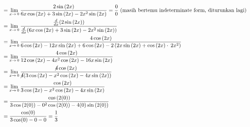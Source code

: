 \documentclass[12pt]{article}
\begin{document}
\begin{fleqn}[2em]
\begin{align*}
{\begin{aligned}
  & = \lim _{x\to \:0} \frac{2\sin \left(2x\right)}{6x\cos \left(2x\right)+3\sin \left(2x\right)-2x^2\sin \left(2x\right)} = \frac{0}{0} \text{ (masih bertemu indeterminate form, diturunkan lagi)} \\
  & = \lim _{x\to \:0} \frac{\frac{d}{dx}(2\sin \left(2x\right))}{\frac{d}{dx}(6x\cos \left(2x\right)+3\sin \left(2x\right)-2x^2\sin \left(2x\right))} \\
  & = \lim _{x\to \:0} \frac{4\cos \left(2x\right)}{6\cos \left(2x\right)-12x\sin \left(2x\right)+6\cos \left(2x\right)-2\left(2x\sin \left(2x\right)+\cos \left(2x\right)\cdot \:2x^2\right)} \\
  & = \lim _{x\to \:0}\frac{4\cos \left(2x\right)}{12\cos \left(2x\right)-4x^2\cos \left(2x\right)-16x\sin \left(2x\right)} \\
  & = \lim _{x\to \:0}\frac{\cancel{4}\cos \left(2x\right)}{\cancel{4}(3\cos \left(2x\right)-x^2\cos \left(2x\right)-4x\sin \left(2x\right))} \\
  & = \lim _{x\to \:0}\frac{\cos \left(2x\right)}
    {3\cos \left(2x\right)-x^2\cos \left(2x\right)-4x\sin \left(2x\right)} \\
  & = \frac{\cos \left(2(0)\right)}{3\cos \left(2(0)\right)-0^2\cos \left(2(0)\right)-4(0)\sin \left(2(0)\right)} \\
  & = \frac{\cos(0)}{3\cos(0) - 0 - 0} = \frac{1}{3}
\end{aligned}
}
\end{align*}

\end{fleqn}
\end{document}
